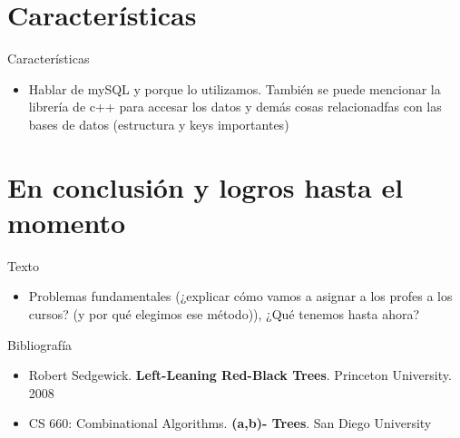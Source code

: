 \documentclass[10pt]{beamer}
\begin{document}
\section{Características}
\begin{frame}{Características}{}
\begin{block}{}

\begin{itemize}

\item Hablar de mySQL y porque lo utilizamos. También se puede mencionar la librería de c++ para accesar los datos y demás cosas relacionadfas con las bases de datos (estructura y keys importantes)

\end{itemize}


\end{block}
\end{frame}




\section{En conclusión y logros hasta el momento }
\begin{frame}{Texto}{}
\begin{block}{}

\begin{itemize}
\item Problemas fundamentales (¿explicar cómo vamos a asignar a los profes a los cursos? (y por qué elegimos ese método)), ¿Qué tenemos hasta ahora?
\end{itemize}


\end{block}
\end{frame}






\begin{frame}{Bibliografía}{}
\begin{block}{}
\begin{itemize}

\item Robert Sedgewick. \textbf{Left-Leaning Red-Black Trees}. Princeton University. 2008

\item CS 660: Combinational Algorithms. \textbf{(a,b)- Trees}. San Diego University
\end{itemize}
\end{block}
\end{frame}
\end{document}
